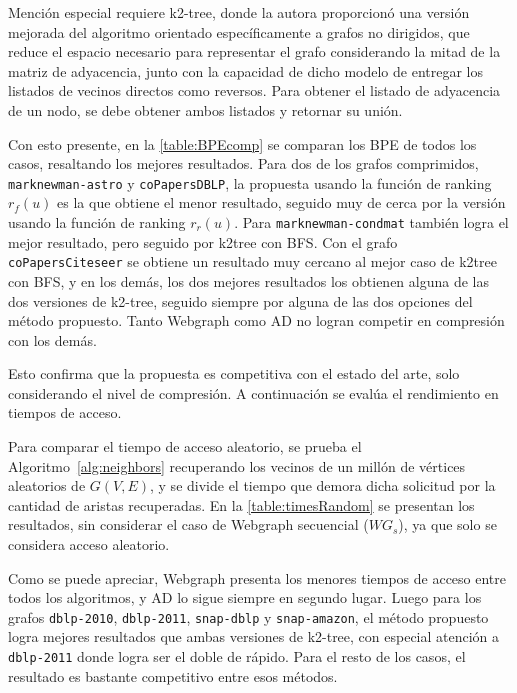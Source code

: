 Mención especial requiere k2-tree, donde la autora proporcionó una versión mejorada del algoritmo orientado específicamente a grafos no dirigidos, que reduce el espacio necesario para representar el grafo considerando la mitad de la matriz de adyacencia, junto con la capacidad de dicho modelo de entregar los listados de vecinos directos como reversos. Para obtener el listado de adyacencia de un nodo, se debe obtener ambos listados y retornar su unión.

Con esto presente, en la \autoref{table:BPEcomp} se comparan los BPE de todos los casos, resaltando los mejores resultados. Para dos de los grafos comprimidos, \texttt{marknewman-astro} y \texttt{coPapersDBLP}, la propuesta usando la función de ranking $r_{f}(u)$ es la que obtiene el menor resultado, seguido muy de cerca por la versión usando la función de ranking $r_{r}(u)$. Para \texttt{marknewman-condmat} también logra el mejor resultado, pero seguido por k2tree con BFS. Con el grafo \texttt{coPapersCiteseer} se obtiene un resultado muy cercano al mejor caso de k2tree con BFS, y en los demás, los dos mejores resultados los obtienen alguna de las dos versiones de k2-tree, seguido siempre por alguna de las dos opciones del método propuesto. Tanto Webgraph como AD no logran competir en compresión con los demás.

Esto confirma que la propuesta es competitiva con el estado del arte, solo considerando el nivel de compresión. A continuación se evalúa el rendimiento en tiempos de acceso.



Para comparar el tiempo de acceso aleatorio, se prueba el Algoritmo~\ref{alg:neighbors} recuperando los vecinos de un millón de vértices aleatorios de $G(V, E)$, y se divide el tiempo que demora dicha solicitud por la cantidad de aristas recuperadas. En la \autoref{table:timesRandom} se presentan los resultados, sin considerar el caso de Webgraph secuencial ($WG_{s}$), ya que solo se considera acceso aleatorio. 

Como se puede apreciar, Webgraph presenta los menores tiempos de acceso entre todos los algoritmos, y AD lo sigue siempre en segundo lugar. Luego para los grafos \texttt{dblp-2010}, \texttt{dblp-2011}, \texttt{snap-dblp} y \texttt{snap-amazon}, el método propuesto logra mejores resultados que ambas versiones de k2-tree, con especial atención a \texttt{dblp-2011} donde logra ser el doble de rápido. Para el resto de los casos, el resultado es bastante competitivo entre esos métodos.

